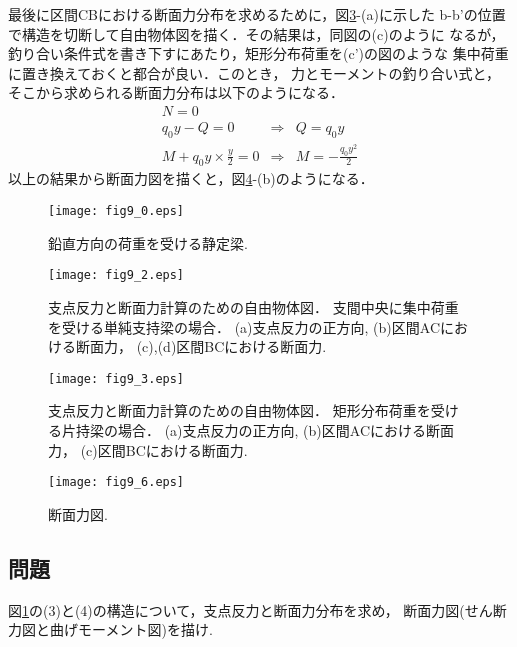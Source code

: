 \documentclass[10pt,a4j]{jarticle}
\begin{document}
\begin{enumerate}
最後に区間CBにおける断面力分布を求めるために，図\ref{fig:fig9_3}-(a)に示した
b-b'の位置で構造を切断して自由物体図を描く．その結果は，同図の(c)のように
なるが，釣り合い条件式を書き下すにあたり，矩形分布荷重を(c')の図のような
集中荷重に置き換えておくと都合が良い．このとき，
力とモーメントの釣り合い式と，そこから求められる断面力分布は以下のようになる．
\begin{eqnarray}
	N=0 & & 
	\label{eqn:}
	\\
	q_0y -Q=0 & \Rightarrow & Q=q_0y 
	\label{eqn:}
	\\
	M+q_0y\times \frac{y}{2} =0 & \Rightarrow & M=-\frac{q_0y^2}{2}
	\label{eqn:}
\end{eqnarray}
以上の結果から断面力図を描くと，図\ref{fig:fig9_6}-(b)のようになる．
\end{enumerate}
\begin{figure}
	\begin{center}
	\texttt{[image: fig9\_0.eps]} 
	\end{center}
	\caption{
		鉛直方向の荷重を受ける静定梁.
	} 
	\label{fig:fig9_0}
\end{figure}
\begin{figure}
	\begin{center}
	\texttt{[image: fig9\_2.eps]} 
	\end{center}
	\caption{
		支点反力と断面力計算のための自由物体図．
		支間中央に集中荷重を受ける単純支持梁の場合．
		(a)支点反力の正方向, (b)区間ACにおける断面力，
		(c),(d)区間BCにおける断面力. 
	} 
	\label{fig:fig9_2}
\end{figure}
\begin{figure}
	\begin{center}
	\texttt{[image: fig9\_3.eps]} 
	\end{center}
	\caption{
		支点反力と断面力計算のための自由物体図．
		矩形分布荷重を受ける片持梁の場合．
		(a)支点反力の正方向, (b)区間ACにおける断面力，
		(c)区間BCにおける断面力. 
	} 
	\label{fig:fig9_3}
\end{figure}
\begin{figure}
	\begin{center}
	\texttt{[image: fig9\_6.eps]} 
	\end{center}
	\caption{
		断面力図. 
	} 
	\label{fig:fig9_6}
\end{figure}
\subsection{問題}
図\ref{fig:fig9_0}の(3)と(4)の構造について，支点反力と断面力分布を求め，
断面力図(せん断力図と曲げモーメント図)を描け. 
\end{document}
